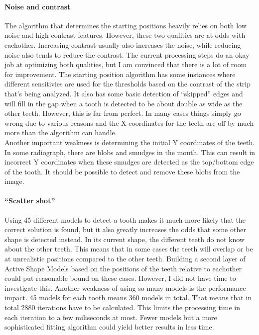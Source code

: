 \documentclass[a4paper,10pt]{article}
\begin{document}
\paragraph{Noise and contrast} The algorithm that determines the starting positions heavily relies on both low noise and high contrast features. However, these two qualities are at odds with eachother. Increasing contrast usually also increases the noise, while reducing noise also tends to reduce the contrast. The current processing steps do an okay job at optimizing both qualities, but I am convinced that there is a lot of room for improvement. The starting position algorithm has some instances where different sensitivies are used for the thresholds based on the contrast of the strip that's being analyzed. It also has some basic detection of ``skipped'' edges and will fill in the gap when a tooth is detected to be about double as wide as the other teeth. However, this is far from perfect. In many cases things simply go wrong due to various reasons and the X coordinates for the teeth are off by much more than the algorithm can handle.
\\
Another important weakness is determining the initial Y coordinates of the teeth. In some radiograph, there are blobs and smudges in the mouth. This can result in incorrect Y coordinates when these smudges are detected as the top/bottom edge of the tooth. It should be possible to detect and remove these blobs from the image.

\paragraph{``Scatter shot''} Using 45 different models to detect a tooth makes it much more likely that the correct solution is found, but it also greatly increases the odds that some other shape is detected instead. In its current shape, the different teeth do not know about the other teeth. This means that in some cases the teeth will overlap or be at unrealistic positions compared to the other teeth. Building a second layer of Active Shape Models based on the positions of the teeth relative to eachother could put reasonable bound on these cases. However, I did not have time to investigate this. Another weakness of using so many models is the performance impact. 45 models for each tooth means 360 models in total. That means that in total 2880 iterations have to be calculated. This limits the processing time in each iteration to a few miliseconds at most. Fewer models but a more sophisticated fitting algorithm could yield better results in less time.
\end{document}
